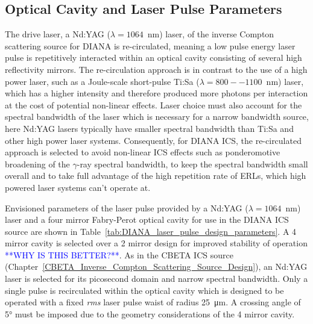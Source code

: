 \documentclass[../main.tex]{subfiles}
\begin{document}
\subsection{Optical Cavity and Laser Pulse Parameters}

The drive laser, a Nd:YAG ($\lambda = 1064$~\si{\nano\meter}) laser, of the inverse Compton scattering source for DIANA is re-circulated, meaning a low pulse energy laser pulse is repetitively interacted within an optical cavity consisting of several high reflectivity mirrors. The re-circulation approach is in contrast to the use of a high power laser, such as a Joule-scale short-pulse Ti:Sa ($\lambda = 800--1100$~\si{\nano\meter}) laser, which has a higher intensity and therefore produced more photons per interaction at the cost of potential non-linear effects. Laser choice must also account for the spectral bandwidth of the laser which is necessary for a narrow bandwidth source, here Nd:YAG lasers typically have smaller spectral bandwidth than Ti:Sa and other high power laser systems. Consequently, for DIANA ICS, the re-circulated approach is selected to avoid non-linear ICS effects such as ponderomotive broadening of the $\gamma$-ray spectral bandwidth, to keep the spectral bandwidth small overall and to take full advantage of the high repetition rate of ERLs, which high powered laser systems can't operate at.      

Envisioned parameters of the laser pulse provided by a Nd:YAG ($\lambda = 1064$~\si{\nano\meter}) laser and a four mirror Fabry-Perot optical cavity for use in the DIANA ICS source are shown in Table~\ref{tab:DIANA_laser_pulse_design_parameters}. A 4 mirror cavity is selected over a 2 mirror design for improved stability of operation \textcolor{blue}{**WHY IS THIS BETTER?**}. As in the CBETA ICS source (Chapter~\ref{CBETA_Inverse_Compton_Scattering_Source_Design}), an Nd:YAG laser is selected for its picosecond domain and narrow spectral bandwidth. Only a single pulse is recirculated within the optical cavity which is designed to be operated with a fixed \textit{rms} laser pulse waist of radius 25~\si{\micro\meter}. A crossing angle of 5\si{\degree} must be imposed due to the geometry considerations of the 4 mirror cavity.
\end{document}
